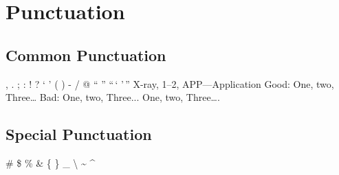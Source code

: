 \documentclass{article}
\begin{document}
    \section{Punctuation}
        \subsection{Common Punctuation}
            , \quad . \quad ; \quad :\newline
            ! \quad ? \quad ` \quad '\newline
            ( \quad ) \quad [ \quad ]\newline
            \quad - \quad / \quad * \quad @\newline
            `` \quad '' \quad ``\,` '\,''\newline
            X-ray, 1--2, APP---Application\newline
            Good: One, two, Three\dots\newline
            Bad: One, two, Three...\newline
            One, two, Three\dots.
        
        \subsection{Special Punctuation}
            \# \quad \$ \quad \% \quad \&\newline
            \{ \quad \} \quad \_ \quad \textbackslash\newline
            \~{} \quad \^{} \quad 
\end{document}
